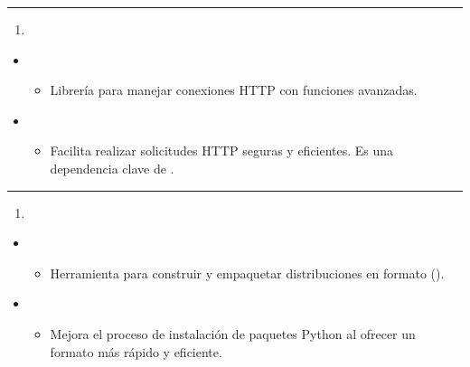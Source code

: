 \documentclass[a4paper,10pt,spanish]{sphinxmanual}
\begin{document}
\bigskip\hrule\bigskip

\begin{enumerate}
%
\setcounter{enumi}{40}
\item {} 
\sphinxAtStartPar
{}

\end{enumerate}
\begin{itemize}
\item {} 
\sphinxAtStartPar
{}
\begin{itemize}
\item {} 
\sphinxAtStartPar
Librería para manejar conexiones HTTP con funciones avanzadas.

\end{itemize}

\item {} 
\sphinxAtStartPar
{}
\begin{itemize}
\item {} 
\sphinxAtStartPar
Facilita realizar solicitudes HTTP seguras y eficientes. Es una dependencia clave de .

\end{itemize}

\end{itemize}


\bigskip\hrule\bigskip

\begin{enumerate}
%
\setcounter{enumi}{41}
\item {} 
\sphinxAtStartPar
{}

\end{enumerate}
\begin{itemize}
\item {} 
\sphinxAtStartPar
{}
\begin{itemize}
\item {} 
\sphinxAtStartPar
Herramienta para construir y empaquetar distribuciones en formato  ().

\end{itemize}

\item {} 
\sphinxAtStartPar
{}
\begin{itemize}
\item {} 
\sphinxAtStartPar
Mejora el proceso de instalación de paquetes Python al ofrecer un formato más rápido y eficiente.

\end{itemize}

\end{itemize}
\end{document}

